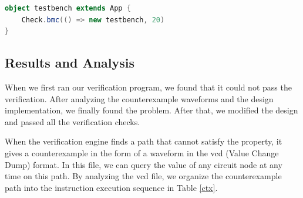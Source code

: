 \documentclass[conference]{IEEEtran}
\theoremstyle{definition}
\begin{document}
\begin{lstlisting}[language=scala, caption={A Code Snippet to Call Verification Process}, label=checkcode]
object testbench extends App {
    Check.bmc(() => new testbench, 20)
}
\end{lstlisting}    

\subsection{Results and Analysis}
When we first ran our verification program, we found that it could not pass the verification.
After analyzing the counterexample waveforms and the design implementation, we finally found the problem.
After that, we modified the design and passed all the verification checks.

When the verification engine finds a path that cannot satisfy the property, it gives a counterexample in the form of a waveform in the vcd (Value Change Dump) format.
In this file, we can query the value of any circuit node at any time on this path.
By analyzing the vcd file, we organize the counterexample path into the instruction execution sequence in Table \ref{ctx}.
\end{document}
